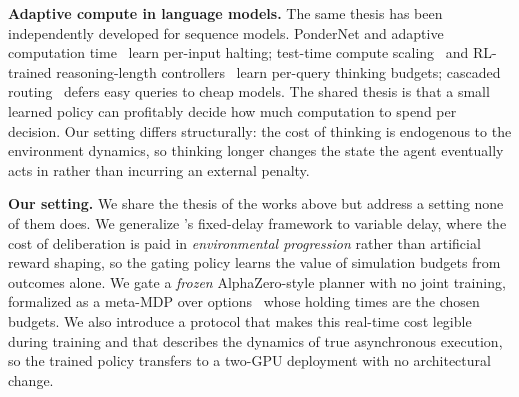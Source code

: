 \documentclass{article}
\begin{document}
\noindent\textbf{Adaptive compute in language models.}
The same thesis has been independently developed for sequence models.
PonderNet and adaptive computation
time~\citep{graves2016act,banino2021pondernet,schuster2022calm} learn
per-input halting; test-time compute
scaling~\citep{snell2024scaling,deepseek2025r1,muennighoff2025s1} and
RL-trained reasoning-length
controllers~\citep{aggarwal2025l1,muppidi2025predictive,fang2025thinkless,shen2025dast}
learn per-query thinking budgets; cascaded
routing~\citep{kim2023bigl,chen2023frugalgpt,ong2025routellm} defers
easy queries to cheap models.
The shared thesis is that a small learned policy can profitably decide
how much computation to spend per decision.
Our setting differs structurally: the cost of thinking is endogenous
to the environment dynamics, so thinking longer changes the state the
agent eventually acts in rather than incurring an external penalty.

\noindent\textbf{Our setting.}
We share the thesis of the works above but address a setting none of
them does.
We generalize \citet{ramstedt2019rtrl}'s fixed-delay framework to
variable delay, where the cost of deliberation is paid in
\emph{environmental progression} rather than artificial reward
shaping, so the gating policy learns the value of simulation budgets
from outcomes alone.
We gate a \emph{frozen} AlphaZero-style planner with no joint
training, formalized as a meta-MDP over options~\citep{sutton1999between,bacon2017optioncritic}
whose holding times are the chosen budgets.
We also introduce a protocol that makes this real-time cost legible during training and that describes the dynamics of true asynchronous execution, so the trained policy transfers to a
two-GPU deployment with no architectural change.



\end{document}
